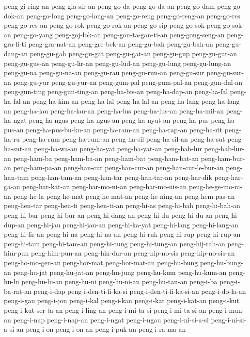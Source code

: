 {peng-gi-ring-an peng-gla-sir-an peng-go-da peng-go-da-an peng-go-dam
peng-go-dok-an peng-go-long peng-go-long-an peng-go-reng peng-go-reng-an
peng-go-res peng-go-res-an peng-go-rok peng-go-rok-an peng-go-sip
peng-go-sok peng-go-sok-an peng-go-yang peng-goj-lok-an
peng-gon-ta-gan-ti-an peng-gong-seng-an peng-gra-fi-ti peng-gra-nat-an
peng-gre-bek-an peng-gu-bah peng-gu-bah-an peng-gu-dang-an peng-gu-gah
peng-gu-gat peng-gu-gat-an peng-gu-gup peng-gu-gur-an peng-gu-gus-an
peng-gu-lir-an peng-gu-lud-an peng-gu-lung peng-gu-lung-an peng-gu-na
peng-gu-na-an peng-gu-rau peng-gu-run-an peng-gu-sur peng-gu-sur-an
peng-gu-yur peng-gu-yur-an peng-gum-pal peng-gum-pal-an peng-gun-dul-an
peng-gun-ting peng-gun-ting-an peng-ha-bis-an peng-ha-dap-an peng-ha-fal
peng-ha-fal-an peng-ha-kim-an peng-ha-lal peng-ha-lal-an peng-ha-lang
peng-ha-lang-an peng-ha-lau peng-ha-lau-an peng-ha-lus peng-ha-lus-an
peng-ha-mil-an peng-ha-ngat peng-ha-ngus peng-ha-ngus-an peng-ha-nyut-an
peng-ha-pus peng-ha-pus-an peng-ha-pus-bu-ku-an peng-ha-ram-an
peng-ha-rap-an peng-ha-rit peng-ha-ru peng-ha-rum peng-ha-rum-an
peng-ha-sil peng-ha-sil-an peng-ha-sut peng-ha-sut-an peng-ha-wa-an
peng-ha-yat peng-ha-yat-an peng-hab-lur peng-hab-lur-an peng-ham-ba
peng-ham-ba-an peng-ham-bat peng-ham-bat-an peng-ham-bur-an peng-ham-pa-an
peng-han-cur peng-han-cur-an peng-han-cur-le-bur-an peng-han-tam
peng-han-tam-an peng-han-tar peng-han-tar-an peng-har-dik peng-har-ga-an
peng-har-kat-an peng-har-mo-ni-an peng-har-mo-nis-an peng-he-ge-mo-ni-an
peng-he-la peng-he-mat peng-he-mat-an peng-he-ning-an peng-hem-pas-an
peng-hen-tar peng-hen-ti peng-hen-ti-an peng-hi-as peng-hi-bah
peng-hi-bah-an peng-hi-bur peng-hi-bur-an peng-hi-dang-an peng-hi-du
peng-hi-du-an peng-hi-dup-an peng-hi-jau peng-hi-jau-an peng-hi-ka-yat
peng-hi-lang peng-hi-lang-an peng-hi-lir-an peng-hi-na peng-hi-na-an
peng-hi-ruk peng-hi-rup peng-hi-rup-an peng-hi-tam peng-hi-tam-an
peng-hi-tung peng-hi-tung-an peng-hij-rah-an peng-him-pun peng-him-pun-an
peng-hin-dar-an peng-hip-no-sis peng-hip-no-sis-an peng-ho-mo-gen-an
peng-hor-mat peng-hor-mat-an peng-hu-bung peng-hu-bung-an peng-hu-jat
peng-hu-jat-an peng-hu-jung peng-hu-kum peng-hu-kum-an peng-hu-lu
peng-hu-lu-an peng-hu-ni peng-hu-ni-an peng-hu-tan-an peng-i-ba
peng-i-ba-rat-an peng-i-dap peng-i-den-ti-fi-ka-si
peng-i-den-ti-fi-ka-si-an peng-i-do-la-an peng-i-gau peng-i-jon peng-i-kal
peng-i-kan peng-i-kat peng-i-kat-an peng-i-kut peng-i-kut-ser-ta-an
peng-i-ling-an peng-i-mi-ta-si peng-i-mi-ta-si-an peng-i-mun-an peng-i-nap
peng-i-nap-an peng-i-ngat peng-i-ngau peng-i-ni-si-a-si
peng-i-ni-si-a-si-an peng-i-on peng-i-on-an peng-i-puk-an peng-i-ra-ma-an
}
